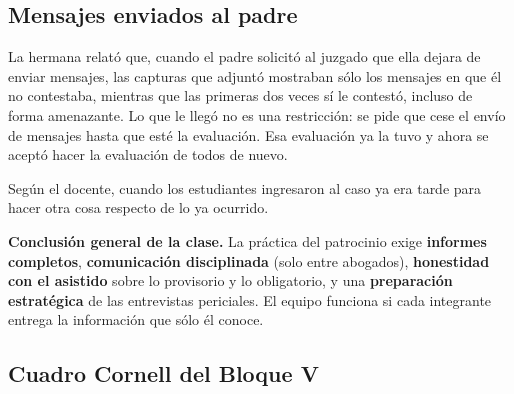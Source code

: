 \documentclass[12pt,oneside]{book}
\begin{document}
\subsection{Mensajes enviados al padre}

La hermana relató que, cuando el padre solicitó al juzgado que ella dejara de enviar mensajes, las capturas que adjuntó mostraban sólo los mensajes en que él no contestaba, mientras que las primeras dos veces sí le contestó, incluso de forma amenazante. Lo que le llegó no es una restricción: se pide que cese el envío de mensajes hasta que esté la evaluación. Esa evaluación ya la tuvo y ahora se aceptó hacer la evaluación de todos de nuevo.


\begin{note}
Según el docente, cuando los estudiantes ingresaron al caso ya era tarde para hacer otra cosa respecto de lo ya ocurrido.
\end{note}

\begin{important}
\textbf{Conclusión general de la clase.} La práctica del patrocinio exige \textbf{informes completos}, \textbf{comunicación disciplinada} (solo entre abogados), \textbf{honestidad con el asistido} sobre lo provisorio y lo obligatorio, y una \textbf{preparación estratégica} de las entrevistas periciales. El equipo funciona si cada integrante entrega la información que sólo él conoce.
\end{important}

\subsection*{Cuadro Cornell del Bloque V}
\end{document}
